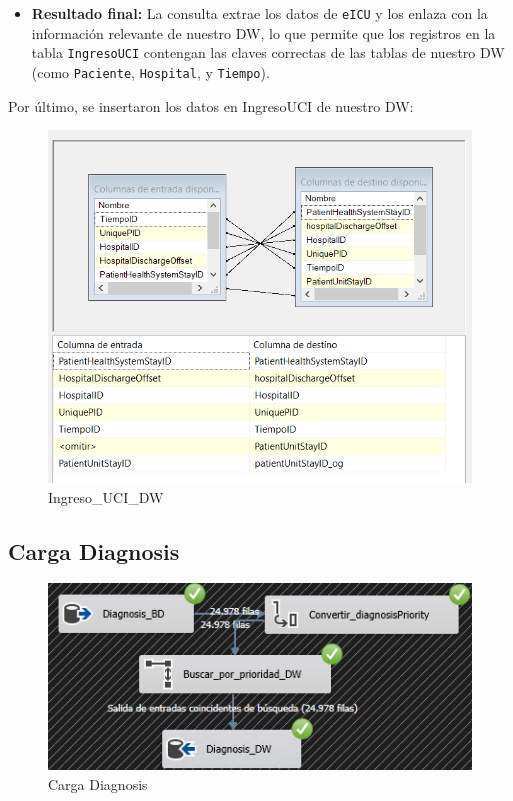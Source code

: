 \documentclass[12pt, a4paper, twoside]{article}
\begin{document}
\begin{itemize}
		\item \textbf{Resultado final:} La consulta extrae los datos de \texttt{eICU} y los enlaza con la información relevante de nuestro DW, lo que permite que los registros en la tabla \texttt{IngresoUCI} contengan las claves correctas de las tablas de nuestro DW (como \texttt{Paciente}, \texttt{Hospital}, y \texttt{Tiempo}).
	\end{itemize}
	
	Por último, se insertaron los datos en IngresoUCI de nuestro DW:
	
	\begin{figure}[H]
		\centering
		\includegraphics[width=1\textwidth]{image/110_carga_ingreso_destino.png}
		\caption{Ingreso\_UCI\_DW}
		\label{fig:28}
	\end{figure}
	
	\subsection{Carga Diagnosis}
	
	\begin{figure}[H]
		\centering
		\includegraphics[width=1\textwidth]{image/112_carga_diagnosis.png}
		\caption{Carga Diagnosis}
		\label{fig:21}
	\end{figure}
	
\end{document}
